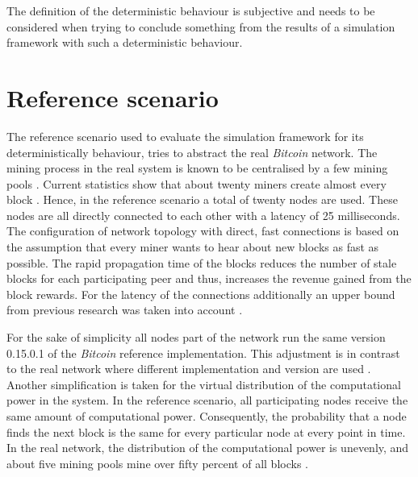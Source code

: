The definition of the deterministic behaviour is subjective and needs to be considered when trying to conclude something from the results of a simulation framework with such a deterministic behaviour.

\section{Reference scenario}
\label{chap:reference_scenario}

The reference scenario used to evaluate the simulation framework for its deterministically behaviour, tries to abstract the real \textit{Bitcoin} network.
The mining process in the real system is known to be centralised by a few mining pools \cite{gervais2014bitcoin, beikverdi2015trend, tschorsch2016bitcoin, clarkresearch, gencer2018decentralization}.
Current statistics show that about twenty miners create almost every block \cite{gencer2018decentralization, blockchaininfopools, coindanceblocks, bitcointickerpools}.
Hence, in the reference scenario a total of twenty nodes are used.
These nodes are all directly connected to each other with a latency of 25 milliseconds.
The configuration of network topology with direct, fast connections is based on the assumption that every miner wants to hear about new blocks as fast as possible.
The rapid propagation time of the blocks reduces the number of stale blocks for each participating peer and thus, increases the revenue gained from the block rewards.
For the latency of the connections additionally an upper bound from previous research was taken into account \cite{decker2013information}.

For the sake of simplicity all nodes part of the network run the same version 0.15.0.1 \cite{bitcoin15} of the \textit{Bitcoin} reference implementation.
This adjustment is in contrast to the real network where different implementation and version are used \cite{coindancenodes}.
Another simplification is taken for the virtual distribution of the computational power in the system.
In the reference scenario, all participating nodes  receive the same amount of computational power.
Consequently, the probability that a node finds the next block is the same for every particular node at every point in time.
In the real network, the distribution of the computational power is unevenly, and about five mining pools mine over fifty percent of all blocks \cite{gervais2014bitcoin, blockchaininfopools, coindanceblocks, bitcointickerpools}. 

